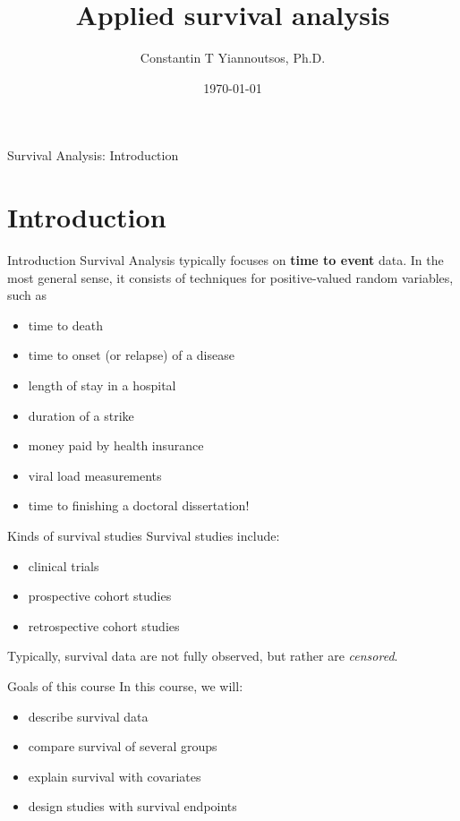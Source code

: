 \documentclass[envcountsect, 10pt, portrait, palatino]{beamer}
\title[]{Applied survival analysis}
\author[Constantin T Yiannoutsos]
{ Constantin T Yiannoutsos, Ph.D.}
\date[]{\today}
\begin{document}
\begin{frame}
  \titlepage
\end{frame}
\begin{frame}{Survival Analysis: Introduction}
  \tableofcontents
\end{frame}
\section{Introduction}
\begin{frame}{Introduction}
Survival Analysis typically focuses on {\bf time to event} data.
In the most general sense, it consists of techniques for
positive-valued random variables, such as

\begin{itemize}
\item time to death
\item time to onset (or relapse) of a disease
\item length of stay in a hospital
\item duration of a strike
\item money paid by health insurance
\item viral load measurements
\item time to finishing a doctoral dissertation!
\end{itemize}
\end{frame}
\begin{frame}{Kinds of survival studies}
Survival studies include:
    \begin{itemize}
    \item clinical trials
    \item prospective cohort studies
    \item retrospective cohort studies
    \end{itemize}

Typically, survival data are not fully observed, but rather are
{\em censored}.
\end{frame}
\begin{frame}{Goals of this course}
In this course, we will:
\begin{itemize}
\item describe survival data
\item compare survival of several groups
\item explain survival with covariates
\item design studies with survival endpoints
\end{itemize}
\end{frame}
\end{document}
